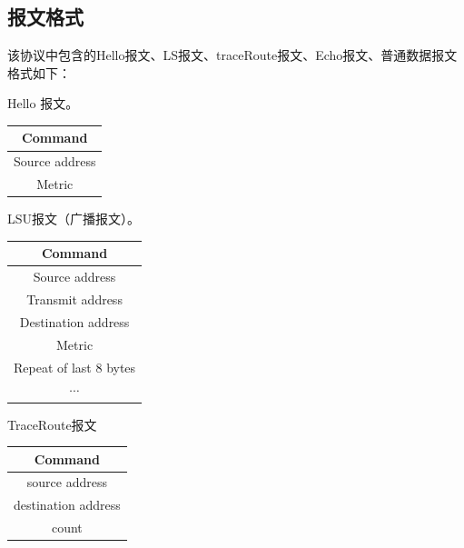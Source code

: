 	\subsection{报文格式} %
	\label{sub:报文格式}
		该协议中包含的Hello报文、LS报文、traceRoute报文、Echo报文、普通数据报文格式如下：
		\par Hello 报文。
	\begin{table}[H]
	\centering
		\begin{tabular}{|c|}
			\hline
			Command \\
			\hline
			Source address \\
			\hline
			Metric \\
			\hline
		\end{tabular}		
	\end{table}
	
	LSU报文（广播报文）。
	\begin{table}[H]
	\centering
		\begin{tabular}{|c|}
			\hline
			Command \\
			\hline
			Source address \\
			\hline
			Transmit address \\
			\hline
			Destination address \\
			\hline
			Metric \\
			\hline
			Repeat of last 8 bytes \\
			\hline
			$\cdots$ \\
			\hline
		\end{tabular}		
	\end{table}

	TraceRoute报文
	\begin{table}[H]
	\centering
		\begin{tabular}{|c|}
			\hline
			Command \\
			\hline
			source address \\
			\hline
			destination address \\
			\hline
			count \\
			\hline
		\end{tabular}		
	\end{table}	

